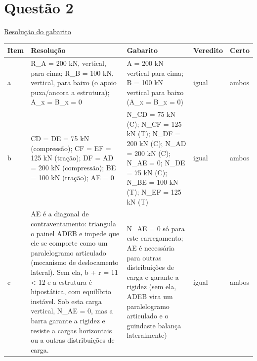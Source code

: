 \documentclass{article}%
\begin{document}
\section*{Questão 2}%
\href{https://poliedroresolve.sistemapoliedro.com.br/vestibulares/ime/2027/ime-2-fase-dia-2-27-10-2026-2-fase-dia-2/dissertativa-2-fisica-2-fase-dia-2-ime-2027}{Resolução do gabarito}\par\smallskip%
\begin{longtable}{@{}p{} p{} p{} p{} p{}@{}}\toprule Item & Resolução & Gabarito & Veredito & Certo \\ \midrule
a & R\_A = 200 kN, vertical, para cima; R\_B = 100 kN, vertical, para baixo (o apoio puxa/ancora a estrutura); A\_x = B\_x = 0 & A = 200 kN vertical para cima; B = 100 kN vertical para baixo (A\_x = B\_x = 0) & igual & ambos \\
b & CD = DE = 75 kN (compressão); CF = EF = 125 kN (tração); DF = AD = 200 kN (compressão); BE = 100 kN (tração); AE = 0 & N\_CD = 75 kN (C); N\_CF = 125 kN (T); N\_DF = 200 kN (C); N\_AD = 200 kN (C); N\_AE = 0; N\_DE = 75 kN (C); N\_BE = 100 kN (T); N\_EF = 125 kN (T) & igual & ambos \\
c & AE é a diagonal de contraventamento: triangula o painel ADEB e impede que ele se comporte como um paralelogramo articulado (mecanismo de deslocamento lateral). Sem ela, b + r = 11 < 12 e a estrutura é hipostática, com equilíbrio instável. Sob esta carga vertical, N\_AE = 0, mas a barra garante a rigidez e resiste a cargas horizontais ou a outras distribuições de carga. & N\_AE = 0 só para este carregamento; AE é necessária para outras distribuições de carga e garante a rigidez (sem ela, ADEB vira um paralelogramo articulado e o guindaste balança lateralmente) & igual & ambos \\
\bottomrule\end{longtable}%
\end{document}
